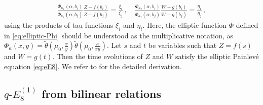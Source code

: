 \documentclass[11pt, a4paper]{article}
\theoremstyle{definition}
\begin{document}
\begin{align}\label{eq:ZW}
    \frac{\Phi_{\kappa_1}(\alpha,b_i)}{\Phi_{\kappa_1}(\alpha,b_j)} \frac{Z-f(b_i)}{Z-f(b_j)} = \frac{\xi_i}{\xi_j} \, , \quad
    \frac{\Phi_{\kappa_2}(\alpha,b_i)}{\Phi_{\kappa_2}(\alpha,b_j)} \frac{W-g(b_i)}{W-g(b_j)} = \frac{\eta_i}{\eta_j} \, ,
\end{align}
using the products of tau-functions $ \xi_i $ and $ \eta_i $. Here, the elliptic function $ \Phi $ defined in \eqref{eq:elliptic-Phi} should be understood as the multiplicative notation, as $ \Phi_{\kappa}(x,y) = \tilde{\theta}(\mu_0,\frac{x}{y}) \tilde{\theta}(\mu_0,\frac{\kappa}{xy}) $. Let $ s $ and $ t $ be variables such that $ Z = f(s) $ and $ W=g(t) $. Then the time evolutions of $ Z $ and $ W $ satisfy the elliptic Painlev\'e equation \eqref{eq:eE8}. We refer to \cite{Kajiwara:2015} for the detailed derivation.



\subsection{\texorpdfstring{$ q\text{-}E_8^{(1)} $}{q-E8(1)} from bilinear relations} \label{app:qE8}
\end{document}
